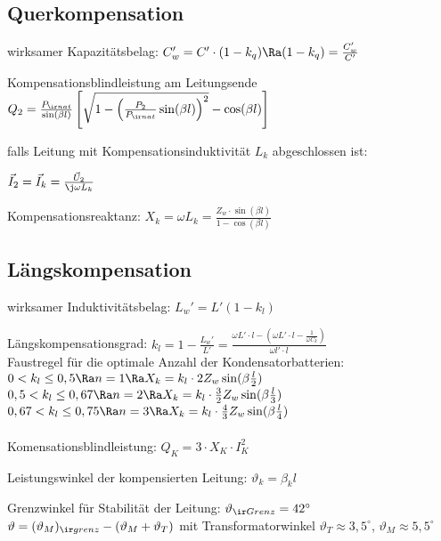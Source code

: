 \documentclass[german]{latex4ei/latex4ei_sheet}
\begin{document}
\begin{sectionbox}
\subsection{Querkompensation}

wirksamer Kapazitätsbelag: $C_w' = C' \cdot (1-k_q) \Ra (1 - k_q) = \frac{C_w'}{C'}$ \\

\begin{emphbox}
Kompensationsblindleistung am Leitungsende\\
$Q_2 = \frac{P_{\ir nat}}{\sin ( \beta l )} \left[ \sqrt{1 - \left( \frac{P_2}{P_{\ir nat}} \sin (\beta l) \right)^2} - \cos (\beta l) \right]$
\end{emphbox}

falls Leitung mit Kompensationsinduktivität $L_k$ abgeschlossen ist:

$\vec I_2 = \vec I_k = \frac{\vec U_2}{\j \omega L_k}$

Kompensationsreaktanz: $X_k = \omega L_k = \frac{Z_w \cdot \sin (\beta l)}{1 - \cos (\beta l)}$
\end{sectionbox}

\begin{sectionbox}
\subsection{Längskompensation}

wirksamer Induktivitätsbelag: $L_w' = L' (1 - k_l)$

Längskompensationsgrad: $k_l = 1 - \frac{L_w'}{L'} = \frac{\omega L' \cdot l - (\omega L' \cdot l - \frac{1}{\omega C_k})}{\omega l' \cdot l}$ \\

Faustregel für die optimale Anzahl der Kondensatorbatterien: \\
$0 < k_l \le 0,5 \Ra n = 1 \Ra X_k = k_l \cdot 2 Z_w \sin (\beta \frac{l}{2})$ \\
$0,5 < k_l \le 0,67 \Ra n = 2 \Ra X_k = k_l \cdot \frac{3}{2} Z_w \sin (\beta \frac{l}{3})$ \\
$0,67 < k_l \le 0,75 \Ra n = 3 \Ra X_k = k_l \cdot \frac{4}{3} Z_w \sin (\beta \frac{l}{4})$ \\ \\

Komensationsblindleistung: $Q_K = 3 \cdot X_K \cdot I_K^2$

Leistungswinkel der kompensierten Leitung: $\vartheta_k = \beta_k l$

Grenzwinkel für Stabilität der Leitung: $\vartheta_{\ir Grenz} = 42^\circ$
$\vartheta = (\vartheta_M)_{\ir grenz} - (\vartheta_M + \vartheta_T)$ mit Transformatorwinkel $\vartheta_T \approx 3,5^\circ$, $\vartheta_M \approx 5,5^\circ$
\end{sectionbox}
\end{document}
